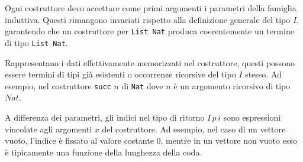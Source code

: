 \begin{description}[leftmargin=1.5em, style=nextline, font=\bfseries]
    \item [Parametri $(p : P)$] 
        Ogni costruttore devo accettare come primi argomenti i parametri della famiglia induttiva. Questi rimangono invariati rispetto 
        alla definizione generale del tipo $I$, garantendo che un costruttore per \texttt{List Nat} produca coerentemente un termine di 
        tipo \texttt{List Nat}.
    \item [Argomenti $(x : A)$]  %
        Rappresentano i dati effettivamente memorizzati nel costruttore, questi possono essere termini di tipi già esistenti o occorrenze 
        ricorsive del tipo $I$ stesso. Ad esempio, nel costruttore \texttt{succ} $n$ di \texttt{Nat} dove $n$ è un argomento ricorsivo di 
        tipo $Nat$.
    \item [Indici $(i : A)$] 
        A differenza dei parametri, gli indici nel tipo di ritorno $I \, p \, i$ sono espressioni vincolate agli argomenti $x$ del costruttore. 
        Ad esempio, nel caso di un vettore vuoto, l'indice è fissato al valore costante $0$, mentre in un vettore non vuoto esso è tipicamente 
        una funzione della lunghezza della coda.
\end{description}

